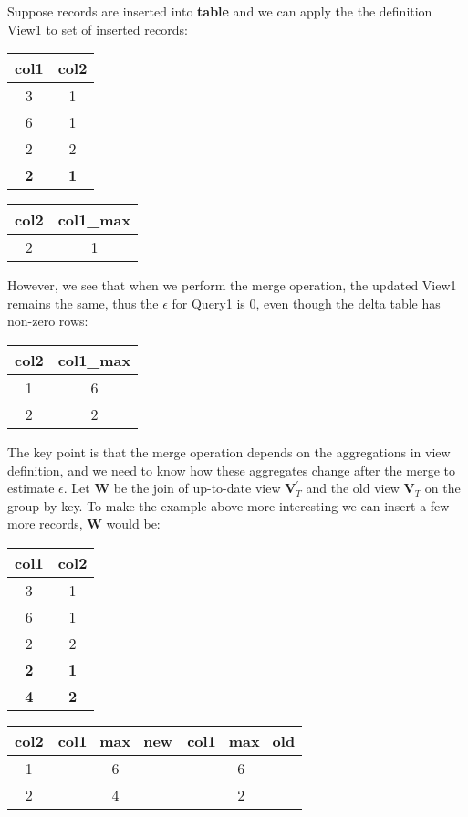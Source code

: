 Suppose records are inserted into \textbf{table} and we can apply
the the definition View1 to set of inserted records:

\begin{center}
\begin{tabular}{|c|c|}
\hline 
col1 & col2\tabularnewline
\hline 
\hline 
3 & 1\tabularnewline
\hline 
6 & 1\tabularnewline
\hline 
2 & 2\tabularnewline
\hline 
\textbf{2} & \textbf{1}\tabularnewline
\hline 
\end{tabular} %
\begin{tabular}{|c|c|}
\hline 
col2 & col1\_max\tabularnewline
\hline 
\hline 
2 & 1\tabularnewline
\hline 
\end{tabular}
\par\end{center}

However, we see that when we perform the merge operation, the updated
View1 remains the same, thus the $\epsilon$ for Query1 is 0, even
though the delta table has non-zero rows:

\begin{center}
\begin{tabular}{|c|c|}
\hline 
col2 & col1\_max\tabularnewline
\hline 
\hline 
1 & 6\tabularnewline
\hline 
2 & 2\tabularnewline
\hline 
\end{tabular}
\par\end{center}

The key point is that the merge operation depends on the aggregations
in view definition, and we need to know how these aggregates change
after the merge to estimate $\epsilon$. Let $\textbf{W}$ be the
join of up-to-date view $\textbf{V}_{T}^{'}$ and the old view $\textbf{V}_{T}$
on the group-by key. To make the example above more interesting we
can insert a few more records, $\textbf{W}$ would be:

\begin{center}
\begin{tabular}{|c|c|}
\hline 
col1 & col2\tabularnewline
\hline 
\hline 
3 & 1\tabularnewline
\hline 
6 & 1\tabularnewline
\hline 
2 & 2\tabularnewline
\hline 
\textbf{2} & \textbf{1}\tabularnewline
\hline 
\textbf{4} & \textbf{2}\tabularnewline
\hline 
\end{tabular} %
\begin{tabular}{|c|c|c|}
\hline 
col2 & col1\_max\_new & col1\_max\_old\tabularnewline
\hline 
\hline 
1 & 6 & 6\tabularnewline
\hline 
2 & 4 & 2\tabularnewline
\hline 
\end{tabular}
\par\end{center}

